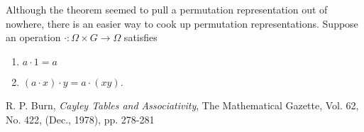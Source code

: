 \documentclass[letterpaper]{article}
\begin{document}
Although the theorem seemed to pull a permutation representation out of nowhere, there is an easier way to cook up permutation representations. Suppose an operation $\cdot \colon \Omega \times G \rightarrow \Omega$ satisfies
\begin{enumerate}
\item $a \cdot 1 = a$
\item $(a \cdot x) \cdot y = a \cdot (xy)$.
\end{enumerate}

\begin{thebibliography}{7}
 R. P. Burn, \emph{Cayley Tables and Associativity},
The Mathematical Gazette, Vol. 62, No. 422, (Dec., 1978), pp. 278-281
\end{thebibliography}
\end{document}
